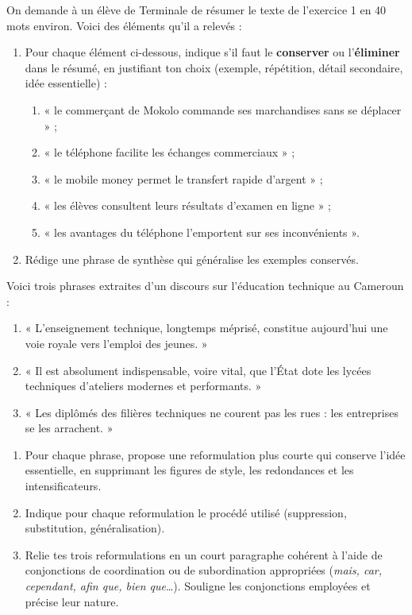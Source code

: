 \documentclass[11pt]{article}
\begin{document}
\begin{exercice}
On demande à un élève de Terminale de résumer le texte de l'exercice 1 en 40 mots environ. Voici des éléments qu'il a relevés :
\begin{enumerate}
\item Pour chaque élément ci-dessous, indique s'il faut le \textbf{conserver} ou l'\textbf{éliminer} dans le résumé, en justifiant ton choix (exemple, répétition, détail secondaire, idée essentielle) :
\begin{enumerate}
\item « le commerçant de Mokolo commande ses marchandises sans se déplacer » ;
\item « le téléphone facilite les échanges commerciaux » ;
\item « le mobile money permet le transfert rapide d'argent » ;
\item « les élèves consultent leurs résultats d'examen en ligne » ;
\item « les avantages du téléphone l'emportent sur ses inconvénients ».
\end{enumerate}
\item Rédige une phrase de synthèse qui généralise les exemples conservés.
\end{enumerate}
\end{exercice}

\begin{exercice}
Voici trois phrases extraites d'un discours sur l'éducation technique au Cameroun :
\begin{enumerate}
\item[a.] « L'enseignement technique, longtemps méprisé, constitue aujourd'hui une voie royale vers l'emploi des jeunes. »
\item[b.] « Il est absolument indispensable, voire vital, que l'État dote les lycées techniques d'ateliers modernes et performants. »
\item[c.] « Les diplômés des filières techniques ne courent pas les rues : les entreprises se les arrachent. »
\end{enumerate}
\begin{enumerate}
\item Pour chaque phrase, propose une reformulation plus courte qui conserve l'idée essentielle, en supprimant les figures de style, les redondances et les intensificateurs.
\item Indique pour chaque reformulation le procédé utilisé (suppression, substitution, généralisation).
\item Relie tes trois reformulations en un court paragraphe cohérent à l'aide de conjonctions de coordination ou de subordination appropriées (\textit{mais, car, cependant, afin que, bien que}\ldots). Souligne les conjonctions employées et précise leur nature.
\end{enumerate}
\end{exercice}
\end{document}
